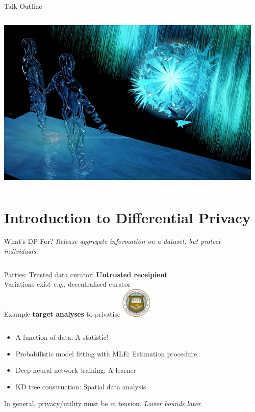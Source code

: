 \documentclass{beamer}
\newcommand{\eg}{\emph{e.g.},\xspace}
\begin{document}
\begin{frame}{Talk Outline}
\begin{columns}[T,onlytextwidth]
		\includegraphics[width=0.98\columnwidth]{figures/brain4}\\[-0.5em]
		\hfill{}
\end{columns}
\end{frame}

\section{Introduction to Differential Privacy}

\begin{frame}{What's DP For?}
	\alert{\emph{Release aggregate information on a dataset, but protect individuals.}} \\[0.5em]
\begin{columns}[T,onlytextwidth]
	\pause
{}

	Parties: Trusted data curator; \textbf{Untrusted receipient} \\
	Variations exist \eg decentralised curator \\[0.5em]

	Example \textbf{target analyses} to privatise
	\hfill\includegraphics[height=4em]{figures/logo-uscb}
\end{columns}
\begin{itemize}
	\item A function of data: A statistic!
	\item Probabilistic model fitting with MLE: Estimation procedure
	\item Deep neural network training: A learner
	\item KD tree construction: Spatial data analysis
\end{itemize}

\pause In general, privacy/utility must be in tension. \emph{Lower bounds later.}
\end{frame}
\end{document}
